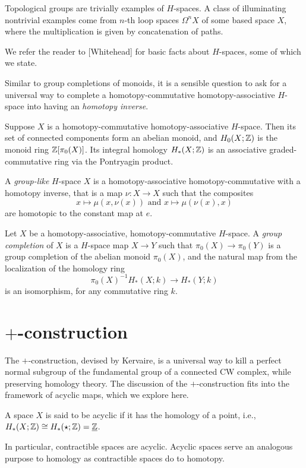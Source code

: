 Topological groups are trivially examples of $H$-spaces. A class of illuminating nontrivial examples come from $n$-th loop spaces $\Omega^n X$ of some based space $X$, where the multiplication is
given by concatenation of paths.

We refer the reader to [Whitehead] for basic facts about $H$-spaces, some of which we state.

Similar to group completions of monoids, it is a sensible question to ask for a universal 
way to complete a homotopy-commutative homotopy-associative $H$-space into having an \emph{homotopy inverse}. 

Suppose $X$ is a homotopy-commutative homotopy-associative $H$-space. Then its set of connected components form
an abelian monoid, and $H_0(X;\mathbb{Z})$ is the monoid ring $\mathbb{Z}[\pi_0(X)]$.
Its integral homology $H_*(X;\mathbb{Z})$ is an associative graded-commutative ring via the Pontryagin product.

\begin{definition}
 A \emph{group-like} $H$-space $X$ is a homotopy-associative homotopy-commutative with
 a homotopy inverse, that is a map $\nu : X \to X$ such that the composites 
 \[
  x \mapsto \mu(x, \nu(x)) \text{ and } x \mapsto \mu(\nu(x), x)
 \]
 are homotopic to the constant map at $e$.
\end{definition}

\begin{theorem}
Let $X$ be a homotopy-associative, homotopy-commutative $H$-space. A \emph{group completion}
of $X$ is a $H$-space map $X \to Y$ such that $\pi_0(X) \to \pi_0(Y)$ is a group completion of the abelian monoid $\pi_0(X)$,
and the natural map from the localization of the homology ring
\[\pi_0(X)^{-1}H_*(X;k) \to H_*(Y;k)\]
is an isomorphism, for any commutative ring $k$.
\end{theorem}
\section{$+$-construction}

The $+$-construction, devised by Kervaire, is a universal way to kill a perfect normal subgroup of the fundamental group of a connected 
CW complex, while preserving homology theory. 
The discussion of the $+$-construction fits into the framework of acyclic maps, which we explore here.

\begin{definition}
A space $X$ is said to be acyclic if it has the homology of a point, i.e., $H_*(X;\mathbb{Z}) \cong H_*(\star;\mathbb{Z}) = \underline{\mathbb{Z}}$.
\end{definition}
In particular, contractible spaces are acyclic. Acyclic spaces serve an analogous purpose to homology as contractible spaces do to homotopy.

